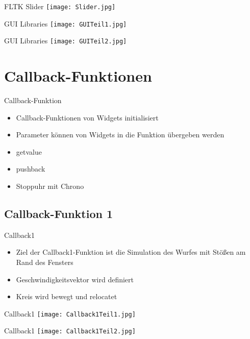 \documentclass{beamer}
\begin{document}
\begin{frame}{FLTK Slider}
\texttt{[image: Slider.jpg]} 
\end{frame}

\begin{frame}{GUI Libraries}
\texttt{[image: GUITeil1.jpg]} 
\end{frame}

\begin{frame}{GUI Libraries}
\texttt{[image: GUITeil2.jpg]} 
\end{frame}

\section{Callback-Funktionen}
\begin{frame}{Callback-Funktion}
\begin{itemize}
\item Callback-Funktionen von Widgets initialisiert
\item Parameter können von Widgets in die Funktion übergeben werden
\item get\textunderscore value
\item push\textunderscore back
\item Stoppuhr mit Chrono
\end{itemize}
\end{frame}

\subsection{Callback-Funktion 1}
\begin{frame}{Callback1}
\begin{itemize}
\item Ziel der Callback1-Funktion ist die Simulation des
Wurfes mit Stößen am Rand des Fensters
\item Geschwindigkeitsvektor wird definiert
\item Kreis wird bewegt und relocatet
\end{itemize}
\end{frame}
\begin{frame}{Callback1}
\texttt{[image: Callback1Teil1.jpg]} 
\end{frame}

\begin{frame}{Callback1}
\texttt{[image: Callback1Teil2.jpg]} 
\end{frame}
\end{document}
